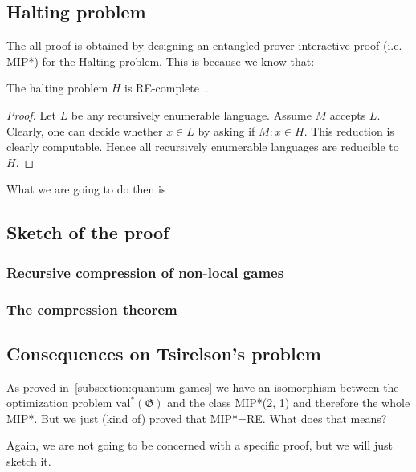 
\subsection{Halting problem}
The all proof is obtained by designing an entangled-prover interactive proof (i.e. MIP*) for the Halting problem. This is because we know that:
\begin{theorem}
    The halting problem $H$ is RE-complete~\cite{Algorithms}.
\begin{proof}
    Let $L$ be any recursively enumerable language. Assume $M$ accepts $L$. Clearly, one can decide whether $x \in L$ by asking if $M: x \in H$. This reduction is clearly computable. Hence all recursively enumerable languages are reducible to $H$.
\end{proof}
\end{theorem}

What we are going to do then is 
\subsection{Sketch of the proof}
\subsubsection{Recursive compression of non-local games}
\subsubsection{The compression theorem}

\subsection{Consequences on Tsirelson's problem}
As proved in~\ref{subsection:quantum-games} we have an isomorphism between the optimization problem $\operatorname{val^{*}}(\mathfrak{G})$ and the class MIP*(2, 1) and therefore the whole MIP*. But we just (kind of) proved that MIP*=RE.
What does that means?

Again, we are not going to be concerned with a specific proof, but we will just sketch it.


